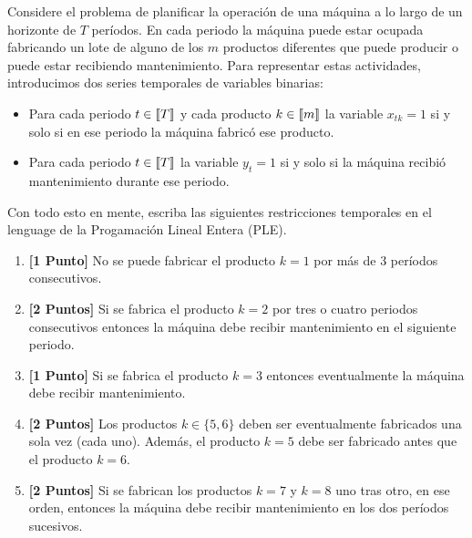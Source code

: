 \documentclass[ a4paper, twoside, 11pt]{article}
\begin{document}
\begin{problem}
Considere el problema de planificar la operaci\'on de una m\'aquina a lo largo de un horizonte de $T$ per\'iodos. En cada periodo la m\'aquina puede estar ocupada fabricando un lote de alguno de los $m$ productos diferentes que puede producir o puede estar recibiendo mantenimiento. Para representar estas actividades, introducimos dos series temporales de variables binarias: 
\begin{itemize}
\item Para cada periodo $t \in \llbracket T \rrbracket$ y cada producto $k \in \llbracket m \rrbracket$ la variable $x_{tk} = 1$ si y solo si en ese periodo la m\'aquina fabric\'o ese producto. 
\item Para cada periodo $t \in \llbracket T \rrbracket$ la variable $y_t = 1$ si y solo si la m\'aquina recibi\'o mantenimiento durante ese periodo. 
\end{itemize}

Con todo esto en mente, escriba las siguientes restricciones temporales en el lenguage de la Progamaci\'on Lineal Entera (PLE). 
\begin{enumerate}[label=\textbf{\alph*)}]
\item \textbf{[1 Punto]} No se puede fabricar el producto $k = 1$ por m\'as de 3 per\'iodos consecutivos. 
\item \textbf{[2 Puntos]} Si se fabrica el producto $k = 2$ por tres o cuatro periodos consecutivos entonces la m\'aquina debe recibir mantenimiento en el siguiente periodo. 
\item \textbf{[1 Punto]} Si se fabrica el producto $k = 3$ entonces eventualmente la m\'aquina debe recibir mantenimiento. 
\item \textbf{[2 Puntos]} Los productos $k \in \{ 5, 6 \}$ deben ser eventualmente fabricados una sola vez (cada uno). Adem\'as, el producto $k = 5$ debe ser fabricado antes que el producto $k = 6$. 
\item \textbf{[2 Puntos]} Si se fabrican los productos $k = 7$ y $k = 8$ uno tras otro, en ese orden, entonces la m\'aquina debe recibir mantenimiento en los dos per\'iodos sucesivos. 

\end{enumerate}

\end{problem}
\fullskip
\end{document}
